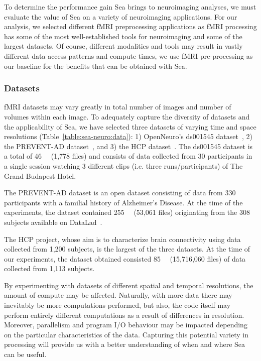     To determine the performance gain Sea brings to neuroimaging analyses, we
    must evaluate the value of Sea on a variety of neuroimaging applications.
    For our analysis, we selected different fMRI preprocessing applications as
    fMRI processing has some of the most well-established tools for neuroimaging
    and some of the largest datasets. Of course, different modalities and tools
    may result in vastly different data access patterns and compute times, we
    use fMRI pre-processing as our baseline for the benefits that can be
    obtained with Sea. 
    
    \subsubsection{Datasets}
    fMRI datasets may vary greatly in total number of images and number of
    volumes within each image. To adequately capture the diversity of datasets
    and the applicability of Sea, we have selected three datasets of varying
    time and space resolutions (Table~\ref{table:sea-neuro:data}): 1)
    OpenNeuro's ds001545 dataset~\cite{ds001545}, 2) the PREVENT-AD
    dataset~\cite{preventad}, and 3) the HCP dataset~\cite{HCP}. The ds001545
    dataset is a total of \SI{46}{\giga\byte} (1,778 files) and consists of data
    collected from 30 participants in a single session watching 3 different
    clips (i.e. three runs/participants) of The Grand Budapest Hotel.
    
    
    The PREVENT-AD dataset is an open dataset consisting of data from 330
    participants with a familial history of Alzheimer's Disease. At the time of
    the experiments, the dataset contained \SI{255}{\giga\byte} (53,061 files)
    originating from the 308 subjects available on
    DataLad~\cite{halchenko2021datalad}.
    
    The HCP project, whose aim is to characterize brain connectivity using data
    collected from 1,200 subjects, is the largest of the three datasets. At the
    time of our experiments, the dataset obtained consisted \SI{85}{\tera\byte}
    (15,716,060 files) of data collected from 1,113 subjects.
    
    By experimenting with datasets of different spatial and temporal
    resolutions, the amount of compute may be affected. Naturally, with more
    data there may inevitably be more computations performed, but also, the code
    itself may perform entirely different computations as a result of
    differences in resolution. Moreover, parallelism and program I/O behaviour
    may be impacted depending on the particular characteristics of the data.
    Capturing this potential variety in processing will provide us with a better
    understanding of when and where Sea can be useful.
    
